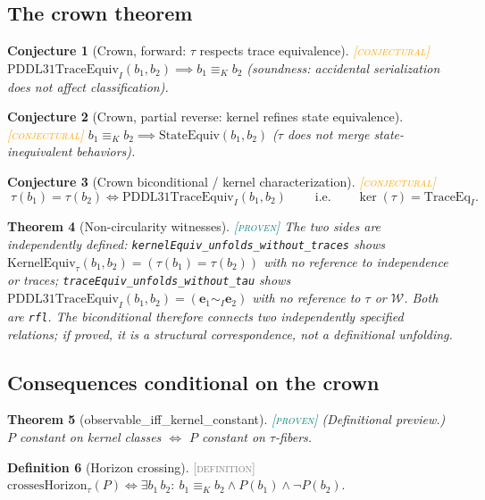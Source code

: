 \documentclass[11pt]{article}
\newcommand{\PROVEN}{\textcolor{teal}{\textsc{[proven]}}}
\newcommand{\DEFINITION}{\textcolor{gray}{\textsc{[definition]}}}
\newcommand{\CONJECTURAL}{\textcolor{orange}{\textsc{[conjectural]}}}
\newcommand{\WS}{\mathcal{W}}                  %
\newcommand{\tmap}{\tau}                       %
\newcommand{\kerEq}{\equiv_{K}}                %
\newcommand{\traceEq}[1]{\sim_{#1}}            %
\theoremstyle{plain}
\newtheorem{theorem}{Theorem}[section]
\newtheorem{conjecture}[theorem]{Conjecture}
\theoremstyle{definition}
\newtheorem{definition}[theorem]{Definition}
\begin{document}
\subsection{The crown theorem}

\begin{conjecture}[Crown, forward: $\tmap$ respects trace equivalence]
\CONJECTURAL\;
$\mathrm{PDDL31TraceEquiv}_I(b_1,b_2) \implies b_1 \kerEq b_2$
(soundness: accidental serialization does not affect classification).
\end{conjecture}

\begin{conjecture}[Crown, partial reverse: kernel refines state equivalence]
\CONJECTURAL\;
$b_1 \kerEq b_2 \implies \mathrm{StateEquiv}(b_1, b_2)$
($\tmap$ does not merge state-inequivalent behaviors).
\end{conjecture}

\begin{conjecture}[Crown biconditional / kernel characterization]
\CONJECTURAL\;
\[
  \boxed{\;\tmap(b_1) = \tmap(b_2) \iff \mathrm{PDDL31TraceEquiv}_I(b_1,b_2)\;}
  \qquad\text{i.e.}\qquad
  \ker(\tmap) = \mathrm{TraceEq}_I .
\]
\end{conjecture}

\begin{theorem}[Non-circularity witnesses]\PROVEN\;
The two sides are independently defined:
\texttt{kernelEquiv\_unfolds\_without\_traces} shows
$\mathrm{KernelEquiv}_\tmap(b_1,b_2) = (\tmap(b_1) = \tmap(b_2))$ with no
reference to independence or traces;
\texttt{traceEquiv\_unfolds\_without\_tau} shows
$\mathrm{PDDL31TraceEquiv}_I(b_1,b_2) =
(\mathbf{e}_1 \traceEq{I} \mathbf{e}_2)$ with no reference to $\tmap$ or
$\WS$. Both are \texttt{rfl}. The biconditional therefore connects two
independently specified relations; if proved, it is a structural
correspondence, not a definitional unfolding.
\end{theorem}

\subsection{Consequences conditional on the crown}

\begin{theorem}[observable\_iff\_kernel\_constant]\PROVEN\;
(Definitional preview.) $P$ constant on kernel classes
$\iff$ $P$ constant on $\tmap$-fibers.
\end{theorem}

\begin{definition}[Horizon crossing]\DEFINITION\;
$\mathrm{crossesHorizon}_\tmap(P) \iff
\exists b_1\, b_2:\ b_1 \kerEq b_2 \wedge P(b_1) \wedge \neg P(b_2)$.
\end{definition}
\end{document}
